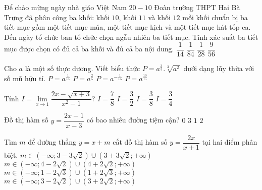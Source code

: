 \begin{ex}%
Để chào mừng ngày nhà giáo Việt Nam $20 - 10$ Đoàn trường THPT Hai Bà Trưng đã phân công ba khối: khối $10$, khối $11$ và khối $12$ mỗi khối chuẩn bị ba tiết mục gồm một tiết mục múa, một tiết mục kịch và một tiết mục hát tốp ca. Đến ngày tổ chức ban tổ chức chọn ngẫu nhiên ba tiết mục. Tính xác suất ba tiết mục được chọn có đủ cả ba khối và đủ cả ba nội dung.
\choice
{\True $\dfrac{1}{14}$}
{$\dfrac{1}{84}$}
{$\dfrac{1}{28}$}
{$\dfrac{9}{56}$}
\end{ex}

\begin{ex}%
Cho $a$ là một số thực dương. Viết biểu thức $P=a^{\frac{3}{5}}.\sqrt[3]{a^2}$ dưới dạng lũy thừa với số mũ hữu tỉ.
\choice
{$P=a^{\frac{1}{15}}$}
{$P=a^{\frac{2}{5}}$}
{$P=a^{-\frac{1}{15}}$}
{\True $P=a^{\frac{19}{15}}$}
\end{ex}

\begin{ex}%
Tính $I={\underset {x\to 1}\lim\dfrac{2x-\sqrt{x+3}}{x^2-1}}$?
\choice
{\True $I=\dfrac{7}{8}$}
{$I=\dfrac{3}{2}$}
{$I=\dfrac{3}{8}$}
{$I=\dfrac{3}{4}$}
\end{ex}

\begin{ex}%
Đồ thị hàm số $y=\dfrac{2x-1}{x-3}$ có bao nhiêu đường tiệm cận?
\choice
{$0$}
{$3$}
{$1$}
{\True $2$}
\end{ex}

\begin{ex}%
Tìm $m$ để đường thẳng $y=x+m$ cắt đồ thị hàm số $y=\dfrac{2x}{x+1}$ tại hai điểm phân biệt.
\choice
{$m\in \left(-\infty; 3-3\sqrt{2}\right) \cup \left(3+3\sqrt{2}; +\infty \right)$}
{$m\in \left(-\infty; 4-2\sqrt{2}\right) \cup \left(4+2\sqrt{2}; +\infty \right)$}
{$m\in \left(-\infty; 1-2\sqrt{3}\right) \cup \left(1+2\sqrt{3}; +\infty \right)$}
{\True $m\in \left(-\infty; 3-2\sqrt{2}\right) \cup \left(3+2\sqrt{2}; +\infty \right)$}
\end{ex}


